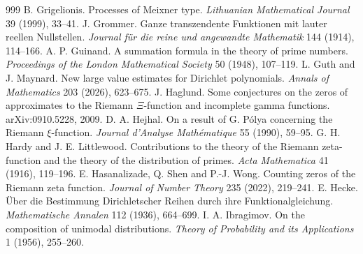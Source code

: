 \begin{thebibliography}{999}
 B. Grigelionis. Processes of Meixner type. \emph{Lithuanian Mathematical Journal} 39 (1999), 33--41.
 J. Grommer. Ganze transzendente Funktionen mit lauter reellen Nullstellen. \emph{Journal f\"ur die reine und angewandte Mathematik} 144 (1914), 114--166.
 A. P. Guinand. A summation formula in the theory of prime numbers. \emph{Proceedings of the London Mathematical Society} 50 (1948), 107--119.
 L. Guth and J. Maynard. New large value estimates for Dirichlet polynomials. \emph{Annals of Mathematics} 203 (2026), 623--675.
 J. Haglund. Some conjectures on the zeros of approximates to the Riemann $\Xi$-function and incomplete gamma functions. arXiv:0910.5228, 2009.
 D. A. Hejhal. On a result of G. P\'olya concerning the Riemann $\xi$-function. \emph{Journal d'Analyse Math\'ematique} 55 (1990), 59--95.
 G. H. Hardy and J. E. Littlewood. Contributions to the theory of the Riemann zeta-function and the theory of the distribution of primes. \emph{Acta Mathematica} 41 (1916), 119--196.
 E. Hasanalizade, Q. Shen and P.-J. Wong. Counting zeros of the Riemann zeta function. \emph{Journal of Number Theory} 235 (2022), 219--241.
 E. Hecke. \"Uber die Bestimmung Dirichletscher Reihen durch ihre Funktionalgleichung. \emph{Mathematische Annalen} 112 (1936), 664--699.
 I. A. Ibragimov. On the composition of unimodal distributions. \emph{Theory of Probability and its Applications} 1 (1956), 255--260.

\end{thebibliography}
